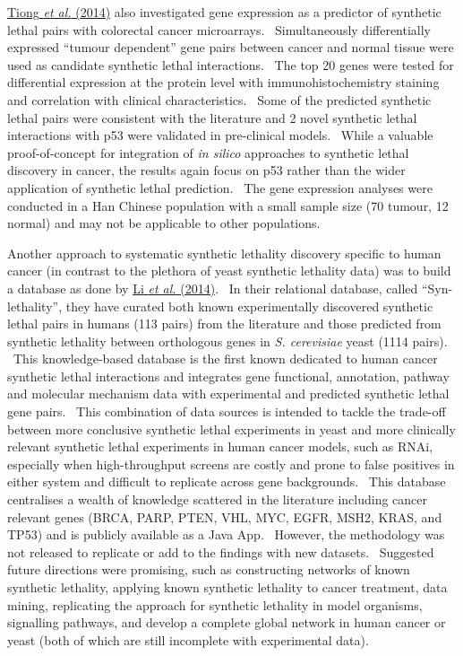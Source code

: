 \hyperlink{ENREF95}{Tiong}\hyperlink{ENREF95}{\textit{ et
al.}}\hyperlink{ENREF95}{ (2014)} also investigated gene expression as
a predictor of synthetic lethal pairs with colorectal cancer
microarrays. \ Simultaneously differentially expressed
{\textquotedblleft}tumour dependent{\textquotedblright} gene pairs
between cancer and normal tissue were used as candidate synthetic
lethal interactions. \ The top 20 genes were tested for differential
expression at the protein level with immunohistochemistry staining and
correlation with clinical characteristics. \ Some of the predicted
synthetic lethal pairs were consistent with the literature and 2 novel
synthetic lethal interactions with p53 were validated in pre-clinical
models. \ While a valuable proof-of-concept for integration of
\textit{in silico} approaches to synthetic lethal discovery in cancer,
the results again focus on p53 rather than the wider application of
synthetic lethal prediction. \ The gene expression analyses were
conducted in a Han Chinese population with a small sample size (70
tumour, 12 normal) and may not be applicable to other populations. \ 


Another approach to systematic synthetic lethality discovery specific to
human cancer (in contrast to the plethora of yeast synthetic lethality
data) was to build a database as done by
\hyperlink{ENREF69}{Li}\hyperlink{ENREF69}{\textit{ et
al.}}\hyperlink{ENREF69}{ (2014)}. \ In their relational database,
called {\textquotedblleft}Syn-lethality{\textquotedblright}, they have
curated both known experimentally discovered synthetic lethal pairs in
humans (113 pairs) from the literature and those predicted from
synthetic lethality between orthologous genes in \textit{S. cerevisiae}
yeast (1114 pairs). \ This knowledge-based database is the first known
dedicated to human cancer synthetic lethal interactions and integrates
gene functional, annotation, pathway and molecular mechanism data with
experimental and predicted synthetic lethal gene pairs. \ This
combination of data sources is intended to tackle the trade-off between
more conclusive synthetic lethal experiments in yeast and more
clinically relevant synthetic lethal experiments in human cancer
models, such as RNAi, especially when high-throughput screens are
costly and prone to false positives in either system and difficult to
replicate across gene backgrounds. \ This database centralises a wealth
of knowledge scattered in the literature including cancer relevant
genes (BRCA, PARP, PTEN, VHL, MYC, EGFR, MSH2, KRAS, and TP53) and is
publicly available as a Java App. \ However, the methodology was not
released to replicate or add to the findings with new datasets.
\ Suggested future directions were promising, such as constructing
networks of known synthetic lethality, applying known synthetic
lethality to cancer treatment, data mining, replicating the approach
for synthetic lethality in model organisms, signalling pathways, and
develop a complete global network in human cancer or yeast (both of
which are still incomplete with experimental data). \ 


